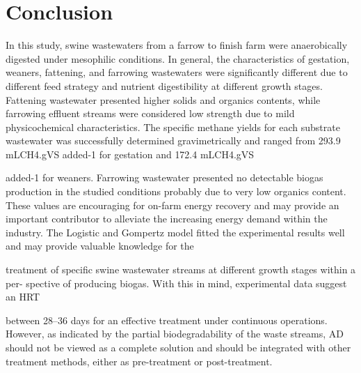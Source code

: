 \section{Conclusion}
In this study, swine wastewaters from a farrow to finish farm were anaerobically digested under mesophilic conditions. In general, the characteristics of gestation, weaners, fattening, and farrowing wastewaters were significantly different due to different feed strategy and nutrient digestibility at different growth stages. Fattening wastewater presented higher solids and organics contents, while farrowing effluent streams were considered low strength due to mild physicochemical characteristics. The specific methane yields for each substrate wastewater was successfully determined gravimetrically and ranged from 293.9 mLCH4.gVS added-1 for gestation and 172.4 mLCH4.gVS

added-1
for weaners. Farrowing wastewater presented no detectable biogas production
in the studied conditions probably due to very low organics content. These values are
encouraging for on-farm energy recovery and may provide an important contributor to
alleviate the increasing energy demand within the industry. The Logistic and Gompertz
model fitted the experimental results well and may provide valuable knowledge for the

treatment of specific swine wastewater streams at different growth stages within a per-
spective of producing biogas. With this in mind, experimental data suggest an HRT

between 28–36 days for an effective treatment under continuous operations. However,
as indicated by the partial biodegradability of the waste streams, AD should not be
viewed as a complete solution and should be integrated with other treatment methods,
either as pre-treatment or post-treatment.